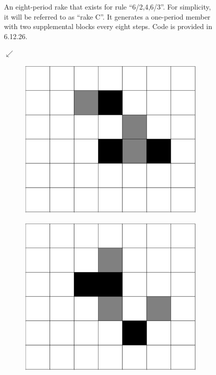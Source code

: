 \documentclass[12pt]{article}
\numberwithin{figure}{section} %
\begin{document}
\begin{figure}[H]
\begin{subfigure}{0.3\textwidth}
     \subcaption{}
   \end{subfigure}
   \setcounter{subfigure}{0}

   \caption{An eight-period rake that exists for rule “6/2,4,6/3”. For simplicity, it will be referred to as “rake C”. It generates a one-period member with two supplemental blocks every eight steps. Code is provided in 6.12.26. }
   \vspace{-1.5em}
\end{figure}

\begin{figure}[H]
      {\LARGE$\swarrow{}$}
	\begin{subfigure}{0.18\textwidth}
     	\centering
     	\includegraphics[width=\linewidth]{Section4/30.0}
     	\subcaption{}
   	\end{subfigure}
    	\begin{subfigure}{0.18\textwidth}
     	\centering
     	\includegraphics[width=\linewidth]{Section4/30.1}

\end{subfigure}
\end{figure}
\end{document}
